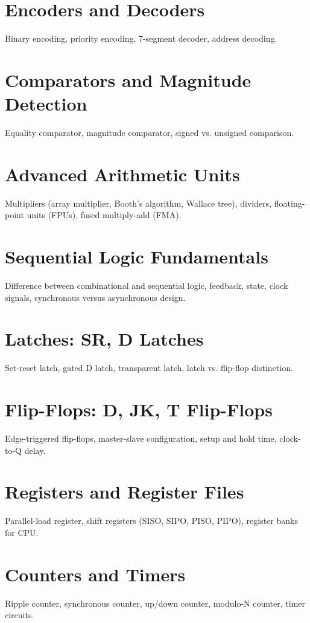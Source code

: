 \chapter{Encoders and Decoders}
Binary encoding, priority encoding, 7-segment decoder, address decoding.

\chapter{Comparators and Magnitude Detection}
Equality comparator, magnitude comparator, signed vs. unsigned comparison.

\chapter{Advanced Arithmetic Units}
Multipliers (array multiplier, Booth's algorithm, Wallace tree), dividers, floating-point units (FPUs), fused multiply-add (FMA).


\chapter{Sequential Logic Fundamentals}
Difference between combinational and sequential logic, feedback, state, clock signals, synchronous versus asynchronous design.

\chapter{Latches: SR, D Latches}
Set-reset latch, gated D latch, transparent latch, latch vs. flip-flop distinction.

\chapter{Flip-Flops: D, JK, T Flip-Flops}
Edge-triggered flip-flops, master-slave configuration, setup and hold time, clock-to-Q delay.

\chapter{Registers and Register Files}
Parallel-load register, shift registers (SISO, SIPO, PISO, PIPO), register banks for CPU.

\chapter{Counters and Timers}
Ripple counter, synchronous counter, up/down counter, modulo-N counter, timer circuits.

